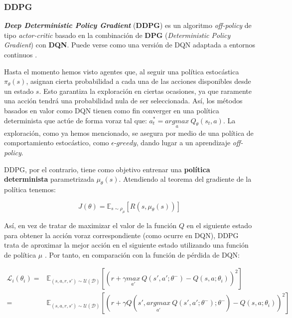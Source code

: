 \subsubsection{DDPG}

\textbf{\textit{Deep Deterministic Policy Gradient}} (\textbf{DDPG}) \cite{lillicrap2015continuous} es un algoritmo \textit{off-policy} de tipo \textit{actor-critic} basado en la combinación de \textbf{DPG} (\textit{Deterministic Policy Gradient}) \cite{silver2014deterministic} con \textbf{DQN}. Puede verse como una versión de DQN adaptada a entornos continuos \cite{zai2020deep}.

Hasta el momento hemos visto agentes que, al seguir una política estocástica $\pi_\theta(s)$, asignan cierta probabilidad a cada una de las acciones disponibles desde un estado $s$. Esto garantiza la exploración en ciertas ocasiones, ya que raramente una acción tendrá una probabilidad nula de ser seleccionada. Así, los métodos basados en valor como DQN tienen como fin converger en una política determinista que actúe de forma voraz tal que: $a_t^* = \underset{a}{argmax}\ Q_\theta(s_t,a)$. La exploración, como ya hemos mencionado, se asegura por medio de una política de comportamiento estocástico, como $\epsilon$-$greedy$, dando lugar a un aprendizaje \textit{off-policy}. 

DDPG, por el contrario, tiene como objetivo entrenar una \textbf{política determinista} parametrizada $\mu_\theta(s)$. Atendiendo al teorema del gradiente de la política \cite{sutton1999policy} tenemos:

\begin{equation}
    J(\theta) = \mathds{E}_{s\sim \rho_\mu}[R(s, \mu_\theta(s))]
\end{equation}

Así, en vez de tratar de maximizar el valor de la función $Q$ en el siguiente estado para obtener la acción voraz correspondiente (como ocurre en DQN), DDPG trata de aproximar la mejor acción en el siguiente estado utilizando una función de política $\mu$ \cite{morales2020grokking}. Por tanto, en comparación con la función de pérdida de DQN:

\begin{align}
    \mathcal{L}_i(\theta_i) = & \mathds{E}_{(s,a,r,s')\sim \mathcal{U}(\mathcal{D})} [(r+\gamma \underset{a'}{max}\ Q(s',a';\theta^-) - Q(s,a;\theta_i))^2] \\
    = & \mathds{E}_{(s,a,r,s')\sim \mathcal{U}(\mathcal{D})}[(r+\gamma Q(s', \underset{a'}{argmax}\ Q(s',a';\theta^-);\theta^-) - Q(s,a;\theta_i))^2]
\end{align}

